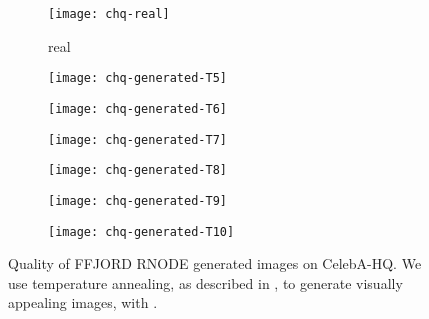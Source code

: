 \documentclass{article}
\theoremstyle{definition}
\theoremstyle{remark}
\begin{document}
\begin{figure*}
  \vskip 0.2in
  \centering
    \begin{subfigure}[t]{.125\textwidth}
    \centering
    \texttt{[image: chq-real]}
    \caption{real}\label{fig:realchq}
    \end{subfigure} 
    \hspace{2em}
    \begin{subfigure}[t]{.125\textwidth}
    \centering
    \texttt{[image: chq-generated-T5]}
    \caption{}\label{fig:T.5chq}
    \end{subfigure} 
    \begin{subfigure}[t]{.125\textwidth}
    \centering
    \texttt{[image: chq-generated-T6]}
    \caption{}\label{fig:T.6chq}
    \end{subfigure} 
    \begin{subfigure}[t]{.125\textwidth}
    \centering
    \texttt{[image: chq-generated-T7]}
    \caption{}\label{fig:T.7chq}
    \end{subfigure} 
    \begin{subfigure}[t]{.125\textwidth}
    \centering
    \texttt{[image: chq-generated-T8]}
    \caption{}\label{fig:T.8chq}
    \end{subfigure} 
    \begin{subfigure}[t]{.125\textwidth}
    \centering
    \texttt{[image: chq-generated-T9]}
    \caption{}\label{fig:T.9chq}
    \end{subfigure} 
    \begin{subfigure}[t]{.125\textwidth}
    \centering
    \texttt{[image: chq-generated-T10]}
    \caption{}\label{fig:T.10chq}
    \end{subfigure} 
    \caption{Quality of FFJORD RNODE generated images on CelebA-HQ. We use
      temperature annealing,  as described in \cite{glow}, to generate visually appealing
  images, with .}\label{fig:imnetgen}
    \vskip -0.2in
\end{figure*}
\end{document}
